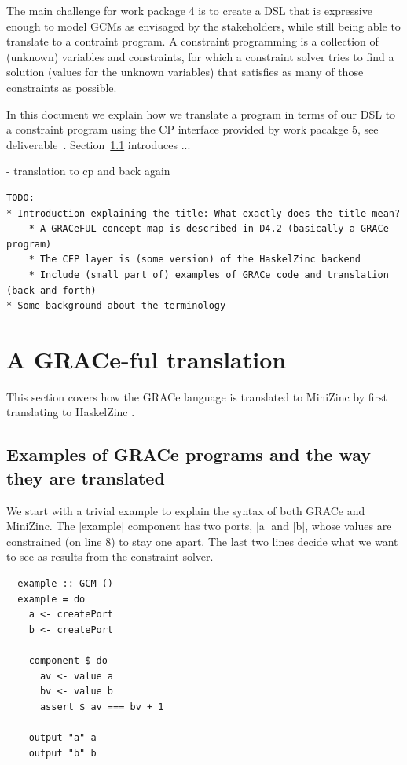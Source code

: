 \documentclass{article}
\begin{document}
The main challenge for work package 4 is to create a \ac{DSL} that is expressive
enough to model \acp{GCM} as envisaged by the stakeholders, while still being
able to translate to a contraint program. A constraint programming is a
collection of (unknown) variables and constraints, for which a constraint solver
tries to find a solution (values for the unknown variables) that satisfies as
many of those constraints as possible. 


In this document we explain how we 
translate a program in terms of our \ac{DSL} to a constraint program using the
\ac{CP} interface provided by work pacakge 5, see deliverable~\cite{}.
Section~\ref{} introduces ...



- translation to cp and back again



\begin{verbatim}
TODO:
* Introduction explaining the title: What exactly does the title mean?
    * A GRACeFUL concept map is described in D4.2 (basically a GRACe program)
    * The CFP layer is (some version) of the HaskelZinc backend
    * Include (small part of) examples of GRACe code and translation (back and forth)
* Some background about the terminology
\end{verbatim}

\section{A GRACe-ful translation}

This section covers how the GRACe language is translated to MiniZinc
\cite{MiniZinc} by first translating to HaskelZinc \cite{HaskelZinc}.
%

\subsection{Examples of GRACe programs and the way they are translated}

We start with a trivial example to explain the syntax of both GRACe
and MiniZinc.
%
The |example| component has two ports, |a| and |b|, whose values are
constrained (on line 8) to stay one apart.
%
The last two lines decide what we want to see as results from the
constraint solver.
%
\begin{verbatim}
  example :: GCM ()
  example = do
    a <- createPort
    b <- createPort

    component $ do
      av <- value a
      bv <- value b
      assert $ av === bv + 1

    output "a" a
    output "b" b
\end{verbatim}
\end{document}
